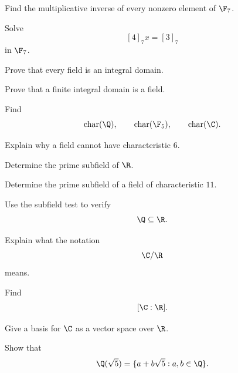 \begin{exercise}[1]
Find the multiplicative inverse of every nonzero element of \(\F_7\).
\end{exercise}

\begin{exercise}[2]
Solve
\[ [4]_7x=[3]_7 \]
in \(\F_7\).
\end{exercise}

\begin{exercise}[2]
Prove that every field is an integral domain.
\end{exercise}

\begin{exercise}[2]
Prove that a finite integral domain is a field.
\end{exercise}

\begin{exercise}[1]
Find
\[ \operatorname{char}(\Q),\qquad\operatorname{char}(\F_5),\qquad\operatorname{char}(\C). \]
\end{exercise}

\begin{exercise}[2]
Explain why a field cannot have characteristic \(6\).
\end{exercise}

\begin{exercise}[2]
Determine the prime subfield of \(\R\).
\end{exercise}

\begin{exercise}[2]
Determine the prime subfield of a field of characteristic \(11\).
\end{exercise}

\begin{exercise}[2]
Use the subfield test to verify
\[ \Q\subseteq\R. \]
\end{exercise}

\begin{exercise}[1]
Explain what the notation
\[ \C/\R \]
means.
\end{exercise}

\begin{exercise}[1]
Find
\[ [\C:\R]. \]
\end{exercise}

\begin{exercise}[2]
Give a basis for \(\C\) as a vector space over \(\R\).
\end{exercise}

\begin{exercise}[2]
Show that
\[ \Q(\sqrt5)=\{a+b\sqrt5:a,b\in\Q\}. \]
\end{exercise}


